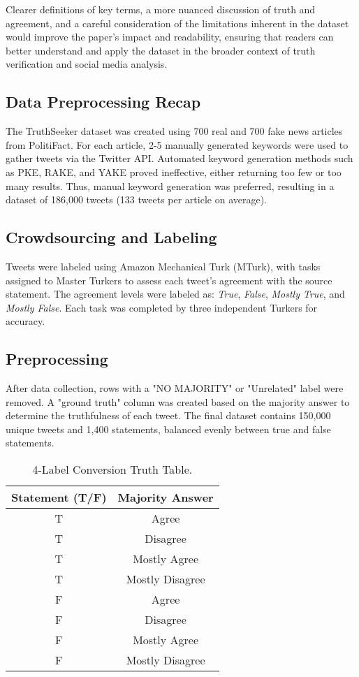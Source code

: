 \documentclass[14]{article}
\begin{document}
Clearer definitions of key terms, a more nuanced discussion of truth and agreement, and a careful consideration of the limitations inherent in the dataset would improve the paper's impact and readability, ensuring that readers can better understand and apply the dataset in the broader context of truth verification and social media analysis.

\subsection{Data Preprocessing Recap}

The TruthSeeker dataset was created using 700 real and 700 fake news articles from PolitiFact. For each article, 2-5 manually generated keywords were used to gather tweets via the Twitter API. Automated keyword generation methods such as PKE, RAKE, and YAKE proved ineffective, either returning too few or too many results. Thus, manual keyword generation was preferred, resulting in a dataset of 186,000 tweets (133 tweets per article on average).

\subsection{Crowdsourcing and Labeling}

Tweets were labeled using Amazon Mechanical Turk (MTurk), with tasks assigned to Master Turkers to assess each tweet's agreement with the source statement. The agreement levels were labeled as: \textit{True}, \textit{False}, \textit{Mostly True}, and \textit{Mostly False}. Each task was completed by three independent Turkers for accuracy.

\subsection{Preprocessing}

After data collection, rows with a "NO MAJORITY" or "Unrelated" label were removed. A "ground truth" column was created based on the majority answer to determine the truthfulness of each tweet. The final dataset contains 150,000 unique tweets and 1,400 statements, balanced evenly between true and false statements.

\begin{table}[h!]
    \centering
    \begin{tabular}{|c|c|}
    \hline
    \textbf{Statement (T/F)} & \textbf{Majority Answer} \\
    \hline
    T & Agree \\
    T & Disagree \\
    T & Mostly Agree \\
    T & Mostly Disagree \\
    F & Agree \\
    F & Disagree \\
    F & Mostly Agree \\
    F & Mostly Disagree \\
    \hline
    \end{tabular}
    \caption{4-Label Conversion Truth Table.}
    \label{tab:truth_table_4label}
\end{table}
\end{document}
